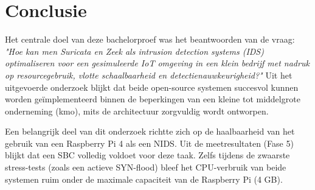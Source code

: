 
\chapter{Conclusie}%
\label{ch:conclusie}


Het centrale doel van deze bachelorproef was het beantwoorden van de vraag: \textit{"Hoe kan men Suricata en Zeek als intrusion detection systems (IDS) optimaliseren voor een gesimuleerde IoT omgeving in een klein bedrijf met nadruk op resourcegebruik, vlotte schaalbaarheid en detectienauwkeurigheid?"} Uit het uitgevoerde onderzoek blijkt dat beide open-source systemen succesvol kunnen worden geïmplementeerd binnen de beperkingen van een kleine tot middelgrote onderneming (kmo), mits de architectuur zorgvuldig wordt ontworpen.

Een belangrijk deel van dit onderzoek richtte zich op de haalbaarheid van het gebruik van een Raspberry Pi 4 als een NIDS. Uit de meetresultaten (Fase 5) blijkt dat een SBC volledig voldoet voor deze taak. Zelfs tijdens de zwaarste stress-tests (zoals een actieve SYN-flood) bleef het CPU-verbruik van beide systemen ruim onder de maximale capaciteit van de Raspberry Pi (4 GB). 

